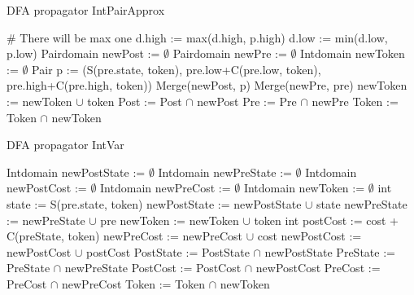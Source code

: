 \documentclass[a4paper,11pt]{article}
\begin{document}
\begin{algorithm}
\caption{DFA propagator IntPairApprox}
\begin{algorithmic}[1]
 \# There will be max one
	\State d.high := max(d.high, p.high)
	\State d.low := min(d.low, p.low)
\EndFor
\EndProcedure
{}
\State Pairdomain newPost := $\emptyset$
\State Pairdomain newPre := $\emptyset$
\State Intdomain newToken := $\emptyset$
		\State Pair p := (S(pre.state, token), pre.low+C(pre.low, token), pre.high+C(pre.high, token))
			\State Merge(newPost, p)
			\State Merge(newPre, pre)
			\State newToken := newToken $\cup$ token 
		\EndIf
	\EndFor
\EndFor
\State Post := Post $\cap$ newPost
\State Pre := Pre $\cap$ newPre
\State Token := Token $\cap$ newToken
\EndProcedure
\end{algorithmic}
\end{algorithm}


\begin{algorithm}
\caption{DFA propagator IntVar}
\begin{algorithmic}[1]
\State Intdomain newPostState := $\emptyset$
\State Intdomain newPreState := $\emptyset$
\State Intdomain newPostCost := $\emptyset$
\State Intdomain newPreCost := $\emptyset$
\State Intdomain newToken := $\emptyset$
		\State int state := S(pre.state, token)
			\State newPostState := newPostState $\cup$ state
			\State newPreState := newPreState $\cup$ pre
			\State newToken := newToken $\cup$ token 
				\State int postCost := cost + C(preState, token)
					\State newPreCost := newPreCost $\cup$ cost
					\State newPostCost := newPostCost $\cup$ postCost
				\EndIf
			\EndFor
		\EndIf
	\EndFor
\EndFor
\State PostState := PostState $\cap$ newPostState
\State PreState := PreState $\cap$ newPreState
\State PostCost := PostCost $\cap$ newPostCost
\State PreCost := PreCost $\cap$ newPreCost
\State Token := Token $\cap$ newToken
\EndProcedure
\end{algorithmic}
\end{algorithm}
\end{document}
